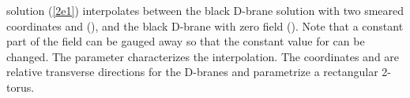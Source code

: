 \documentclass[a4paper,12pt]{article}
\begin{document}
solution (\ref{2e1}) interpolates between the black D\coordHE{}-brane solution
with two smeared coordinates \coordHE{} and \coordHE{} (\coordHE{}), and
the black D\coordHE{}-brane with zero \coordHE{} field (\coordHE{}).
Note that a constant part of the \coordHE{} field can be gauged away so that the
constant value for \coordHE{} can be changed. The parameter
\myHighlight{$\theta$}\coordHE{} characterizes the interpolation. The coordinates \coordHE{} and \coordHE{}
are relative transverse directions for the D\coordHE{}-branes and parametrize
a rectangular 2-torus.
\end{document}
